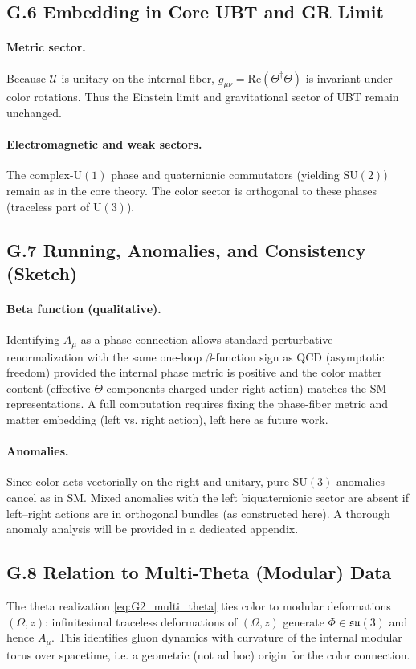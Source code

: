 \subsection*{G.6 Embedding in Core UBT and GR Limit}
\paragraph{Metric sector.} 
Because $\mathcal{U}$ is unitary on the internal fiber, 
$g_{\mu\nu}=\mathrm{Re}(\Theta^\dagger \Theta)$ is invariant under color rotations. 
Thus the Einstein limit and gravitational sector of UBT remain unchanged.

\paragraph{Electromagnetic and weak sectors.} 
The complex-$\mathrm{U}(1)$ phase and quaternionic commutators (yielding $\mathrm{SU}(2)$) remain as in the core theory. 
The color sector is orthogonal to these phases (traceless part of $\mathrm{U}(3)$).

\subsection*{G.7 Running, Anomalies, and Consistency (Sketch)}
\paragraph{Beta function (qualitative).}
Identifying $A_\mu$ as a phase connection allows standard perturbative renormalization with the same one-loop $\beta$-function sign as QCD (asymptotic freedom) provided the internal phase metric is positive and the color matter content (effective $\Theta$-components charged under right action) matches the SM representations. A full computation requires fixing the phase-fiber metric and matter embedding (left vs. right action), left here as future work.

\paragraph{Anomalies.}
Since color acts vectorially on the right and unitary, pure $\mathrm{SU}(3)$ anomalies cancel as in SM. Mixed anomalies with the left biquaternionic sector are absent if left–right actions are in orthogonal bundles (as constructed here). A thorough anomaly analysis will be provided in a dedicated appendix.

\subsection*{G.8 Relation to Multi-Theta (Modular) Data}
The theta realization \eqref{eq:G2_multi_theta} ties color to modular deformations $(\Omega,z)$: infinitesimal traceless deformations of $(\Omega,z)$ generate $\Phi\in\mathfrak{su}(3)$ and hence $A_\mu$. This identifies gluon dynamics with curvature of the internal modular torus over spacetime, i.e. a geometric (not ad hoc) origin for the color connection.

